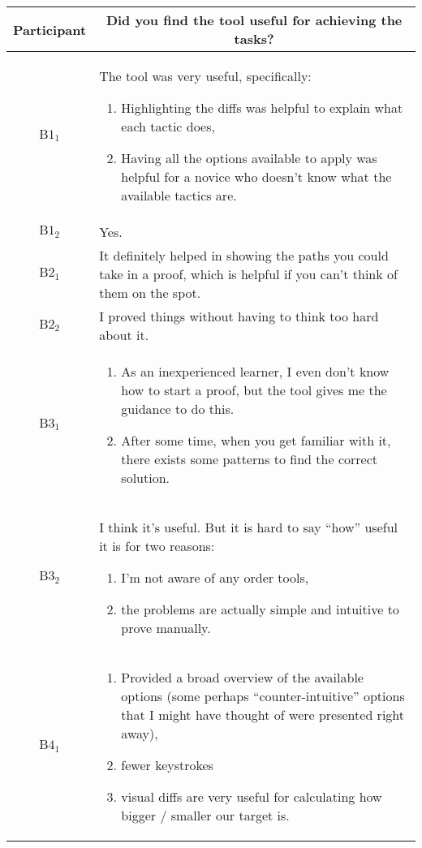 \noindent
\begin{tabularx}{\linewidth}{@{}cX@{}}
  \toprule
  Participant & \multicolumn{1}{c}{
    \textbf{Did you find the tool useful for achieving the tasks?}
  } \\ \midrule
  $\text{B}1_{1}$ & The tool was very useful, specifically: \begin{enumerate} \item Highlighting the diffs was helpful to explain what each tactic does, \item Having all the options available to apply was helpful for a novice who doesn't know what the available tactics are. \end{enumerate} \\
  $\text{B}1_{2}$ & Yes. \\
  $\text{B}2_{1}$ & It definitely helped in showing the paths you could take in a proof, which is helpful if you can't think of them on the spot. \\
  $\text{B}2_{2}$ & I proved things without having to think too hard about it. \\
  $\text{B}3_{1}$ & \begin{enumerate} \item As an inexperienced learner, I even don't know how to start a proof, but the tool gives me the guidance to do this. \item After some time, when you get familiar with it, there exists some patterns to find the correct solution. \end{enumerate} \\
  $\text{B}3_{2}$ & I think it's useful.  But it is hard to say ``how'' useful it is for two reasons: \begin{enumerate} \item I'm not aware of any order tools, \item the problems are actually simple and intuitive to prove manually. \end{enumerate} \\
  $\text{B}4_{1}$ & \begin{enumerate} \item Provided a broad overview of the available options (some perhaps ``counter-intuitive'' options that I might have thought of were presented right away), \item fewer keystrokes \item visual diffs are very useful for calculating how bigger / smaller our target is. \end{enumerate} \\

\end{tabularx}

